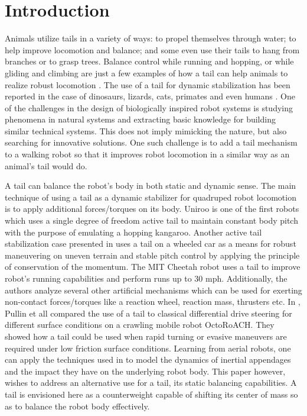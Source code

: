 \section{Introduction}\label{sec:introduction}

Animals utilize tails in a variety of ways: to propel themselves through water; to help improve locomotion and balance; and some even use their tails to hang from branches or to grasp trees. Balance control while running and hopping, or while gliding and climbing are just a few examples of how a tail can help animals to realize robust locomotion \cite{Thomas:Nature2012}. The use of a tail for dynamic stabilization has been reported in the case of dinosaurs, lizards, cats, primates and even humans \cite{ostrom1969osteology,PijnappelsSringer,Walker199841,JusufiIOP2010}. One of the challenges in the design of biologically inspired robot systems is studying phenomena in natural systems and extracting basic knowledge for building similar technical systems. This does not imply mimicking the nature, but also searching for innovative solutions. One such challenge is to add a tail mechanism to a walking robot so that it improves robot locomotion in a similar way as an animal's tail would do. 
 
A tail can balance the robot's body in both static and dynamic sense. The main technique of using a tail as a dynamic stabilizer for quadruped robot locomotion is to apply additional forces/torques on its body. Uniroo \cite{zeglin1991uniroo} is one of the first robots which uses a single degree of freedom active tail to maintain constant body pitch with the purpose of emulating a hopping kangaroo. Another active tail stabilization case presented in \cite{conf/iros/Chang-SiuLTF11} uses a tail on a wheeled car as a means for robust maneuvering on uneven terrain and stable pitch control by applying the principle of conservation of the momentum. The MIT Cheetah robot \cite{DBLP:conf/iros/BriggsLHK12} uses a tail to improve robot's running capabilities and perform runs up to 30 mph. Additionally, the authors analyze several other artificial mechanisms which can be used for exerting non-contact forces/torques like a reaction wheel, reaction mass, thrusters etc. In \cite{PullinICRA12}, Pullin et all compared the use of a tail to classical differential drive steering for different surface conditions on a crawling mobile robot OctoRoACH. They showed how a tail could be used when rapid turning or evasive maneuvers are required under low friction surface conditions. Learning from aerial robots, one can apply the techniques used in \cite{Korpela2013ICRA,Orsag2012JINT} to model the dynamics of inertial appendages and the impact they have on the underlying robot body. This paper however, wishes to address an alternative use for a tail, its static balancing capabilities. A tail is envisioned here as a counterweight capable of shifting its center of mass so as to balance the robot body effectively.
 
